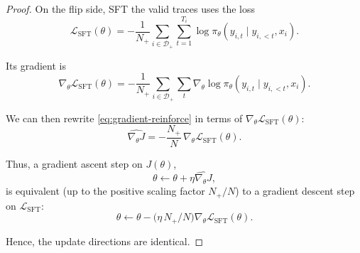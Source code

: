 \documentclass{article}
\begin{document}
\begin{proof}
On the flip side, SFT the valid traces uses the loss
\[
\mathcal{L}_{\text{SFT}}(\theta)
=
- \frac{1}{N_+}
\sum_{i\in \mathcal{D}_+}
\sum_{t=1}^{T_i}
\log \pi_\theta(y_{i,t} \mid y_{i,<t}, x_i).
\]

Its gradient is
\[
\nabla_\theta \mathcal{L}_{\text{SFT}}(\theta)
=
-
\frac{1}{N_+}
\sum_{i\in \mathcal{D}_+}
\sum_t
\nabla_\theta \log \pi_\theta(y_{i,t} \mid y_{i,<t}, x_i).
\]

We can then rewrite \eqref{eq:gradient-reinforce} in terms of $\nabla_\theta
\mathcal{L}_{\text{SFT}}(\theta)$:
\[
\widehat{\nabla_\theta J}
=
- \frac{N_+}{N} \,
\nabla_\theta \mathcal{L}_{\text{SFT}}(\theta).
\]

Thus, a gradient ascent step on $J(\theta)$,
\[
\theta \leftarrow
\theta + \eta \widehat{\nabla_\theta J},
\]
is equivalent (up to the positive scaling factor $N_+/N$) to a gradient
descent step on $\mathcal{L}_{\text{SFT}}$:
\[
\theta \leftarrow
\theta - \bigl(\eta\,N_+/N \bigr)
\nabla_\theta \mathcal{L}_{\text{SFT}}(\theta).
\]

Hence, the update directions are identical.
\end{proof}
\end{document}

